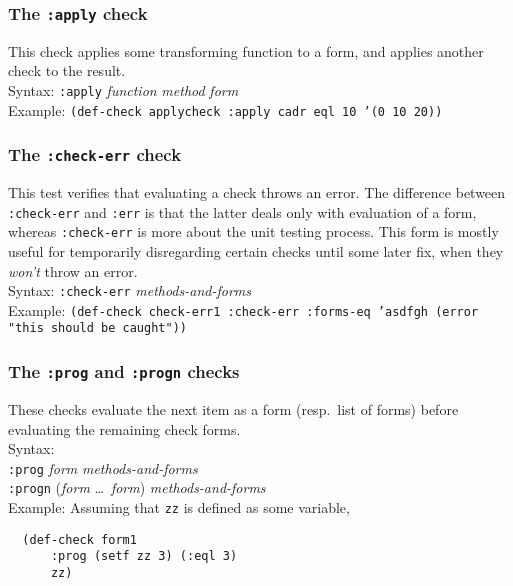 \documentclass{article}
\begin{document}
\subsubsection{The \texttt{:apply} check} 
This check applies some transforming function to a form, and applies
another check to the result.
\\ Syntax: \texttt{:apply} \textit{function} \textit{method} \textit{form}
\\ Example: \texttt{(def-check applycheck :apply cadr eql 10 '(0 10 20))}

\subsubsection{The \texttt{:check-err} check} 
This test verifies that evaluating a check throws an
error. The difference between
\texttt{:check-err} and \texttt{:err} is that the latter deals only
with evaluation of a form, whereas \texttt{:check-err} is more about
the unit testing process.  This form is mostly useful for temporarily
disregarding certain checks until some later fix, when they
\emph{won't} throw an error.
%
\\ Syntax: \texttt{:check-err} \textit{methods-and-forms}
\\ Example: \texttt{(def-check check-err1 :check-err :forms-eq 'asdfgh (error "this should be caught"))}

\subsubsection{The \texttt{:prog} and \texttt{:progn} checks} 
These checks evaluate the next item as a form (resp.\ list of forms)
before evaluating the remaining check forms.
\\ Syntax:
\\ \texttt{:prog} \textit{form} \textit{methods-and-forms}
\\ \texttt{:progn} (\textit{form} \ldots\ \textit{form}) \textit{methods-and-forms}
\\ Example: Assuming that \texttt{zz} is defined as some variable,
\begin{verbatim}
  (def-check form1
      :prog (setf zz 3) (:eql 3)
      zz)
\end{verbatim}
\end{document}
